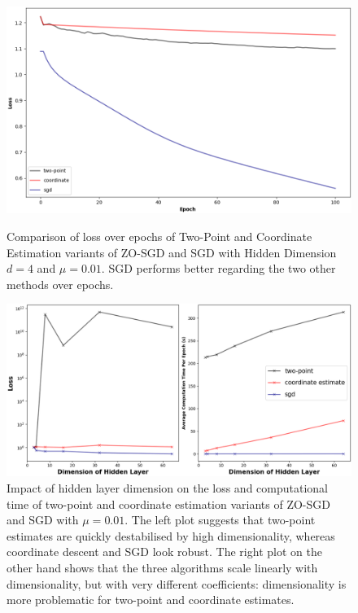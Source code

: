 \begin{figure}[H]
    \centering
    \includegraphics[width=\linewidth]{assets/plot_1.png}
    \label{fig:plot_1}
    \caption{Comparison of loss over epochs of Two-Point and Coordinate Estimation variants of ZO-SGD and SGD with Hidden Dimension $d = 4$ and $\mu = 0.01$. SGD performs better regarding the two other methods over epochs.}
    \label{fig:plot_1}
\end{figure}

\begin{figure}[H]
    \centering
    \includegraphics[width=\linewidth]{assets/plot_2.png}
    \caption{Impact of hidden layer dimension on the loss and computational time of two-point and coordinate estimation variants of ZO-SGD and SGD with $\mu = 0.01$. The left plot suggests that two-point estimates are quickly destabilised by high dimensionality, whereas coordinate descent and SGD look robust. The right plot on the other hand shows that the three algorithms scale linearly with dimensionality, but with very different coefficients: dimensionality is more problematic for two-point and coordinate estimates.}
    \label{fig:plot_2}
\end{figure}

